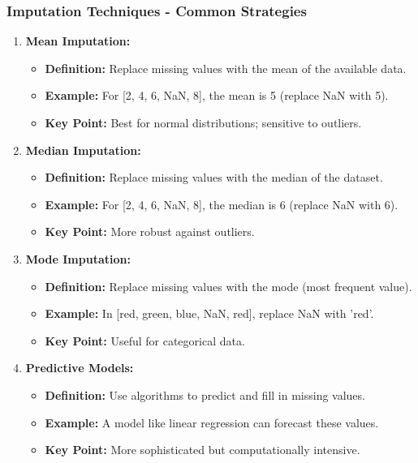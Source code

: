 \documentclass[aspectratio=169]{beamer}
\begin{document}
\begin{frame}[fragile]
    \frametitle{Imputation Techniques - Common Strategies}
    \begin{enumerate}
        \item \textbf{Mean Imputation:}
        \begin{itemize}
            \item \textbf{Definition:} Replace missing values with the mean of the available data.
            \item \textbf{Example:} For [2, 4, 6, NaN, 8], the mean is 5 (replace NaN with 5).
            \item \textbf{Key Point:} Best for normal distributions; sensitive to outliers.
        \end{itemize}

        \item \textbf{Median Imputation:}
        \begin{itemize}
            \item \textbf{Definition:} Replace missing values with the median of the dataset.
            \item \textbf{Example:} For [2, 4, 6, NaN, 8], the median is 6 (replace NaN with 6).
            \item \textbf{Key Point:} More robust against outliers.
        \end{itemize}

        \item \textbf{Mode Imputation:}
        \begin{itemize}
            \item \textbf{Definition:} Replace missing values with the mode (most frequent value).
            \item \textbf{Example:} In [red, green, blue, NaN, red], replace NaN with 'red'.
            \item \textbf{Key Point:} Useful for categorical data.
        \end{itemize}

        \item \textbf{Predictive Models:}
        \begin{itemize}
            \item \textbf{Definition:} Use algorithms to predict and fill in missing values.
            \item \textbf{Example:} A model like linear regression can forecast these values.
            \item \textbf{Key Point:} More sophisticated but computationally intensive.
        \end{itemize}
    \end{enumerate}
\end{frame}
\end{document}
